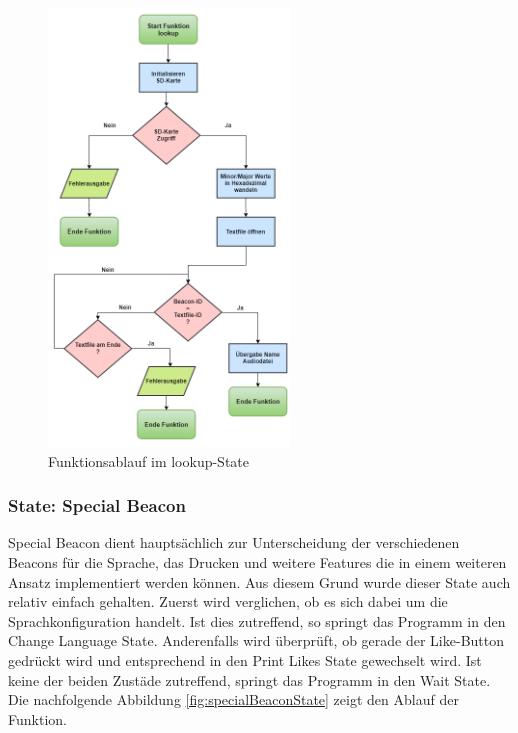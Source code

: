 \begin{figure}[htbp!!!!]
	\centering
	\includegraphics[width=0.57\textwidth]{Data/lookup_picture}
	\caption[Statemachine: lookup]{Funktionsablauf im lookup-State}
	\label{fig:lookupState}
\end{figure} 

\subsubsection*{State: Special Beacon}
Special Beacon dient hauptsächlich zur Unterscheidung der verschiedenen Beacons für die Sprache, das Drucken und weitere Features die in einem weiteren Ansatz implementiert werden können. Aus diesem Grund wurde dieser State auch relativ einfach gehalten. Zuerst wird verglichen, ob es sich dabei um die Sprachkonfiguration handelt. Ist dies zutreffend, so springt das Programm in den Change Language State. Anderenfalls wird überprüft, ob gerade der Like-Button gedrückt wird und entsprechend in den Print \glqq Likes \grqq State gewechselt wird. Ist keine der beiden Zustäde zutreffend, springt das Programm in den Wait State. Die nachfolgende Abbildung \ref{fig:specialBeaconState} zeigt den Ablauf der Funktion.

